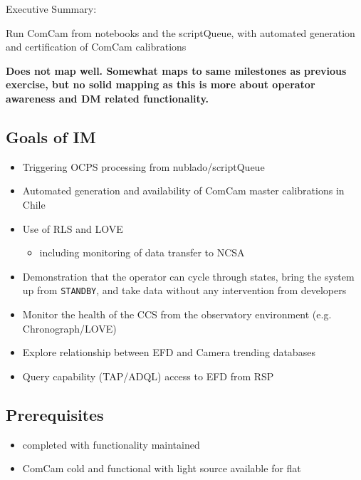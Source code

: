 
Executive Summary:

Run ComCam from notebooks and the scriptQueue, with automated generation and certification of ComCam calibrations

\textbf{Does not map well. Somewhat maps to same milestones as previous exercise, but no solid mapping as this is more about operator awareness and DM related functionality. }

\subsection{Goals of IM}
\label{sec:org3154347}
\begin{itemize}
	\item Triggering \gls{OCPS} processing from nublado/scriptQueue
	\item Automated generation and availability of ComCam master calibrations in Chile
	\item Use of \gls{RLS} and \gls{LOVE}
	\begin{itemize}
		\item including monitoring of data transfer to NCSA
	\end{itemize}
	\item Demonstration that the operator can cycle through states, bring
	the system up from \texttt{STANDBY}, and take data without any intervention from developers
	\item Monitor the health of the \gls{CCS} from the observatory environment (e.g. Chronograph/\gls{LOVE})
	\item Explore relationship between \gls{EFD} and Camera trending databases
	\item Query capability (TAP/ADQL) access to \gls{EFD} from \gls{RSP}
\end{itemize}

\subsection{Prerequisites}
\begin{itemize}
	\item{ completed with functionality maintained}
	\item{ComCam cold and functional with light source available for flat}
\end{itemize}


